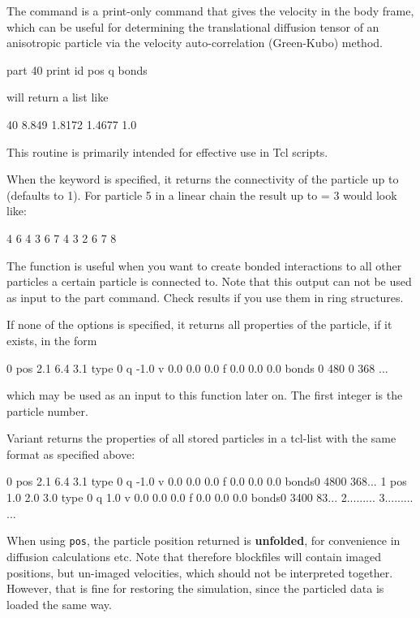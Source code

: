 The  command is a print-only command that
gives the velocity in the body frame, which can be useful for 
determining the translational diffusion tensor of an anisotropic 
particle via the velocity auto-correlation (Green-Kubo) method.

\begin{code}
part 40 print id pos q bonds
\end{code}
will return a list like
\begin{tclcode}
40 8.849 1.8172 1.4677 1.0 {}
\end{tclcode}
This routine is primarily intended for effective use in Tcl scripts.

When the keyword  is specified, it returns the
connectivity of the particle up to  (defaults to 1). For
particle 5 in a linear chain the result up to  = 3 would
look like:
\begin{tclcode}
{ { 4 } { 6 } } { { 4 3 } { 6 7 } } { {4 3 2 } { 6 7 8 } } 
\end{tclcode}
The function is useful when you want to create bonded interactions to
all other particles a certain particle is connected to. Note that this
output can not be used as input to the part command. Check results if
you use them in ring structures.

If none of the options is specified, it returns all properties of the
particle, if it exists, in the form
\begin{tclcode}
  0 pos 2.1 6.4 3.1 type 0 q -1.0 v 0.0 0.0 0.0 f 0.0 0.0 0.0
  bonds { {0 480} {0 368} ... } 
\end{tclcode}
which may be used as an input to this function later on. The first
integer is the particle number.

Variant  returns the properties of all stored particles in
a tcl-list with the same format as specified above:
\begin{tclcode}
{0 pos 2.1 6.4 3.1 type 0 q -1.0 v 0.0 0.0 0.0 f 0.0 0.0 0.0
 bonds{{0 480}{0 368}...}} 
{1 pos 1.0 2.0 3.0 type 0 q 1.0 v 0.0 0.0 0.0 f 0.0 0.0 0.0
 bonds{{0 340}{0 83}...}} 
{2...{{...}...}}
{3...{{...}...}}
...
\end{tclcode}

When using \texttt{pos}, the particle position returned is {\bf
  unfolded}, for convenience in diffusion calculations etc.  Note that
therefore blockfiles will contain imaged positions, but un-imaged
velocities, which should not be interpreted together. However, that is
fine for restoring the simulation, since the particled data is loaded
the same way.

